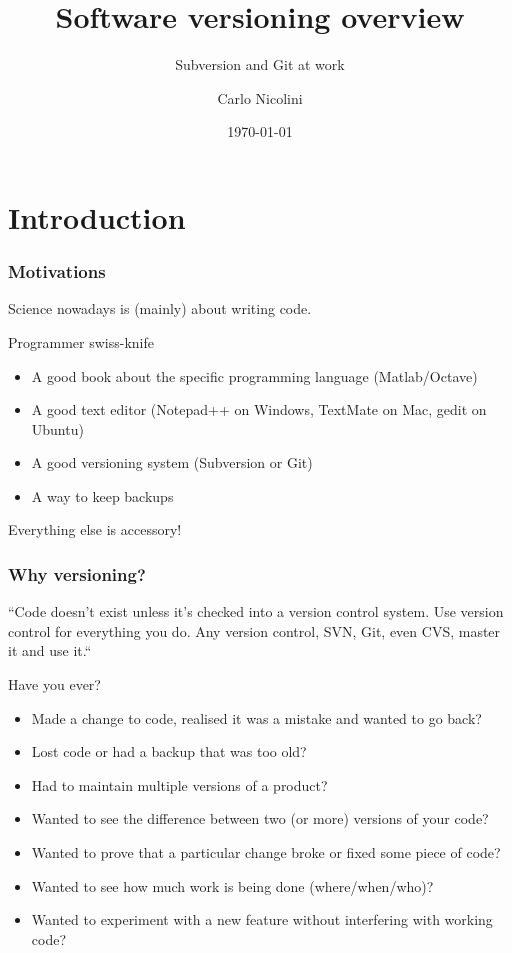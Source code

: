 \documentclass[10pt]{beamer}
\title{Software versioning overview}
\subtitle{Subversion and Git at work}
\author{Carlo Nicolini}
\date{\today}
\begin{document}

\section{Introduction}
\begin{frame}
\frametitle{Motivations}
Science nowadays is (mainly) about writing code.
\begin{block}{Programmer swiss-knife}
\begin{itemize}
\item<1-> A good book about the specific programming language (Matlab/Octave)
\item<2-> A good text editor (Notepad++ on Windows, TextMate on Mac, gedit on Ubuntu)
\item<3-> A good versioning system (Subversion or Git)
\item<4-> A way to keep backups
\end{itemize}
\end{block}
Everything else is accessory!
\end{frame}

\begin{frame}
\frametitle{Why versioning?}
``Code doesn’t exist unless it’s checked into a version control system. Use version control for everything you do. Any version control, SVN, Git, even CVS, master it and use it.``

\begin{block}{Have you ever?}
\begin{small} 
\begin{itemize}
  \item  Made a change to code, realised it was a mistake and wanted to go back?
  \item  Lost code or had a backup that was too old?
  \item  Had to maintain multiple versions of a product?
  \item  Wanted to see the difference between two (or more) versions of your code?
  \item  Wanted to prove that a particular change broke or fixed some piece of code?
  \item  Wanted to see how much work is being done (where/when/who)?
  \item  Wanted to experiment with a new feature without interfering with working code?
 \end{itemize}
\end{small}
\end{block}
\end{frame}
\end{document}
